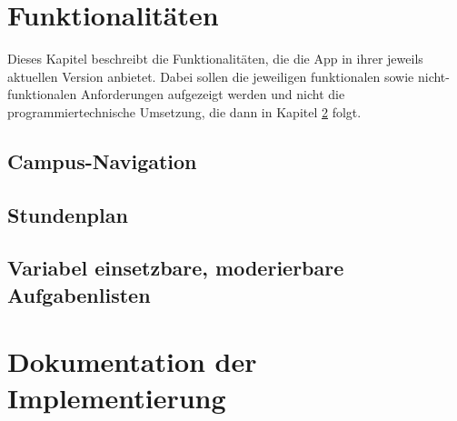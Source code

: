 \documentclass[noindent]{tudreport}
\begin{document}
	\chapter{Funktionalitäten}\label{chap:functionalities}
		Dieses Kapitel beschreibt die Funktionalitäten, die die App in ihrer jeweils aktuellen Version anbietet. Dabei sollen die jeweiligen funktionalen sowie nicht-funktionalen Anforderungen aufgezeigt werden und nicht die programmiertechnische Umsetzung, die dann in Kapitel \ref{chap:documentation} folgt.
		
		\section{Campus-Navigation}\label{sec:campus_navigation}
		
		\section{Stundenplan}\label{sec:timetable}
		
		\section{Variabel einsetzbare, moderierbare Aufgabenlisten}\label{sec:todo_list}
		
	\chapter{Dokumentation der Implementierung}\label{chap:documentation}
\end{document}
